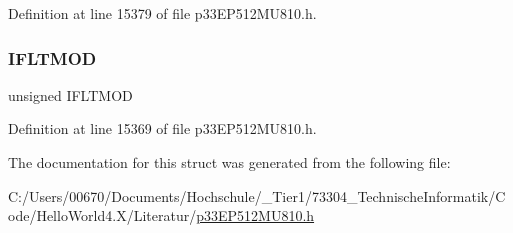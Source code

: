 Definition at line 15379 of file p33\+E\+P512\+M\+U810.\+h.

\mbox{\label{structtag_f_c_l_c_o_n6_b_i_t_s_a4573eed251d96a98a6b5ba1c7cc30451}} 
\subsubsection{\texorpdfstring{I\+F\+L\+T\+M\+OD}{IFLTMOD}}
{\footnotesize\ttfamily unsigned I\+F\+L\+T\+M\+OD}



Definition at line 15369 of file p33\+E\+P512\+M\+U810.\+h.



The documentation for this struct was generated from the following file\+:\begin{DoxyCompactItemize}
\item 
C\+:/\+Users/00670/\+Documents/\+Hochschule/\+\_\+\+Tier1/73304\+\_\+\+Technische\+Informatik/\+Code/\+Hello\+World4.\+X/\+Literatur/\hyperlink{p33_e_p512_m_u810_8h}{p33\+E\+P512\+M\+U810.\+h}\end{DoxyCompactItemize}
